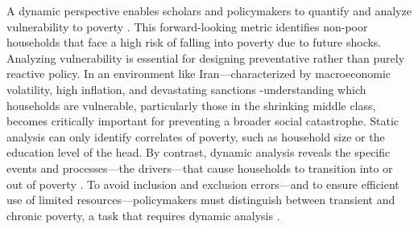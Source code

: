 \documentclass[12pt,a4paper]{article}
\begin{document}
 A dynamic perspective enables scholars and policymakers to quantify and analyze vulnerability to poverty \citep{ChaudhuriJalanSuryahadi2002}. This forward-looking metric identifies non-poor households that face a high risk of falling into poverty due to future shocks. Analyzing vulnerability is essential for designing preventative rather than purely reactive policy. In an environment like Iran—characterized by macroeconomic volatility, high inflation, and devastating sanctions \citep{WorldBank2023}-understanding which households are vulnerable, particularly those in the shrinking middle class, becomes critically important for preventing a broader social catastrophe. Static analysis can only identify correlates of poverty, such as household size or the education level of the head. By contrast, dynamic analysis reveals the specific events and processes—the drivers—that cause households to transition into or out of poverty \citep{McKayOkidi2003}. To avoid inclusion and exclusion errors—and to ensure efficient use of limited resources—policymakers must distinguish between transient and chronic poverty, a task that requires dynamic analysis \citep{dang2020impute, baulch2000economic}.
 
\end{document}
